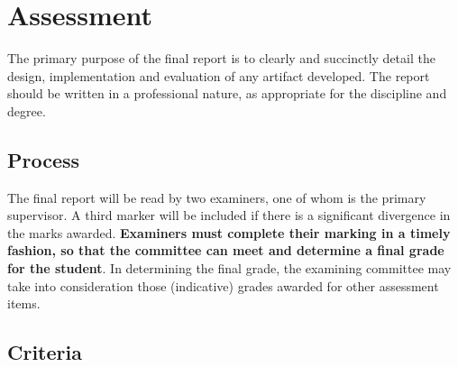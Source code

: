 \section{Assessment}
The primary purpose of the final report is to clearly and succinctly
detail the design, implementation and evaluation of any artifact
developed.  The report should be written in a professional nature, as
appropriate for the discipline and degree.\\

\subsection{Process}
\noindent The final report will be read by two examiners,
one of whom is the primary supervisor.  A third marker will be included if there is a significant divergence in the marks awarded.  {\bf
  Examiners must complete their marking in a timely fashion, so that
  the committee can meet and determine a final grade for the student}.
In determining the final grade, the examining committee may take into
consideration those (indicative) grades awarded for other assessment
items.

\newpage

\subsection{Criteria}

